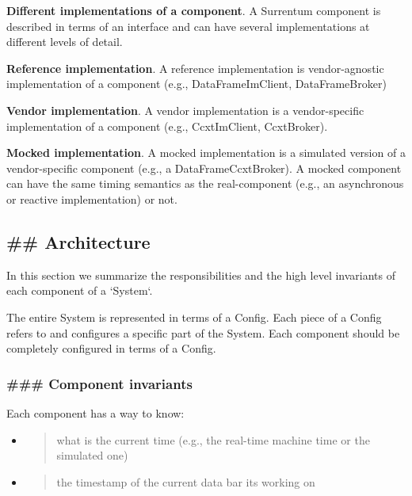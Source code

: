 \documentclass[11pt, reqno]{amsart}
\begin{document}
\textbf{Different implementations of a component}. A Surrentum component
is described in terms of an interface and can have several
implementations at different levels of detail.

\textbf{Reference implementation}. A reference implementation is
vendor-agnostic implementation of a component (e.g., DataFrameImClient,
DataFrameBroker)

\textbf{Vendor implementation}. A vendor implementation is a
vendor-specific implementation of a component (e.g., CcxtImClient,
CcxtBroker).

\textbf{Mocked implementation}. A mocked implementation is a simulated
version of a vendor-specific component (e.g., a DataFrameCcxtBroker). A
mocked component can have the same timing semantics as the
real-component (e.g., an asynchronous or reactive implementation) or
not.

\hypertarget{architecture}{%
\subsection{\#\# Architecture}\label{architecture}}

In this section we summarize the responsibilities and the high level
invariants of each component of a `System`.

The entire System is represented in terms of a Config. Each piece of a
Config refers to and configures a specific part of the System. Each
component should be completely configured in terms of a Config.

\hypertarget{component-invariants}{%
\subsubsection{\#\#\# Component invariants}\label{component-invariants}}

Each component has a way to know:

\begin{itemize}
\item
  \begin{quote}
  what is the current time (e.g., the real-time machine time or the
  simulated one)
  \end{quote}
\item
  \begin{quote}
  the timestamp of the current data bar it\textquotesingle s working on
  \end{quote}
\end{itemize}
\end{document}
